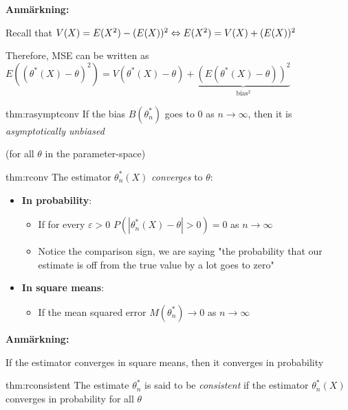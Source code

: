   \par\bigskip
  \noindent\textbf{Anmärkning:}\par
  \noindent Recall that $V(X) = E(X^2)-(E(X))^2\Leftrightarrow E(X^2) = V(X)+(E(X))^2$\par
  \noindent Therefore, MSE can be written as $E((\theta^*(X)-\theta)^2) = V(\theta^*(X)-\theta)+\underbrace{(E(\theta^*(X)-\theta))^2}_{\text{bias$^2$}}$
  \par\bigskip
  \begin{theo}{thm:rasymptconv}
    If the bias $B(\theta_n^*)$ goes to 0 as $n\to\infty$, then it is \textit{asymptotically unbiased}
    \par\bigskip
    \noindent (for all $\theta$ in the parameter-space)
  \end{theo}
  \par\bigskip
  \begin{theo}{thm:rconv}
    The estimator $\theta_n^*(X)$ \textit{converges} to $\theta$:\par
    \begin{itemize}
      \item\textbf{In probability}:\par
        \begin{itemize}
          \item If for every $\varepsilon>0$ $P(\left|\theta_n^*(X)-\theta\right|>0) = 0$ as $n\to\infty$\par
          \item Notice the comparison sign, we are saying "the probability that our estimate is off from the true value by a lot goes to zero"
        \end{itemize}\par
      \item\textbf{In square means}:\par
        \begin{itemize}
          \item If the mean squared error $M(\theta_n^*)\to0$ as $n\to\infty$
        \end{itemize}
    \end{itemize}
  \end{theo}
  \par\bigskip
  \noindent\textbf{Anmärkning:}\par
  \noindent If the estimator converges in square means, then it converges in probability
  \par\bigskip
  \begin{theo}[Consistent]{thm:rconsistent}
    The estimate $\theta_n^*$ is said to be \textit{consistent} if the estimator $\theta_n^*(X)$ converges in probability for all $\theta$
\end{theo}
